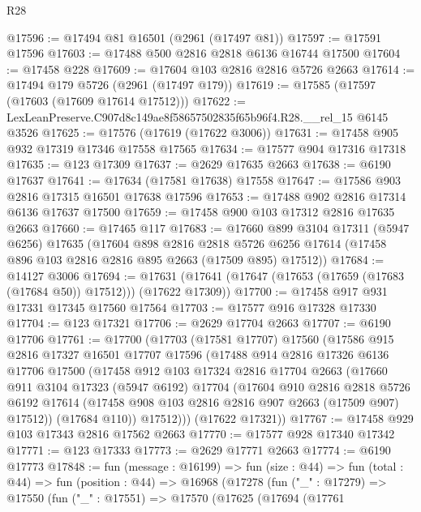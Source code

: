 \begin{lexlean}{R28}
\begin{coremodule}
@17596 := @17494 @81 @16501 (@2961 (@17497 @81))
@17597 := @17591 @17596
@17603 := @17488 @500 @2816 @2818 @6136 @16744 @17500
@17604 := @17458 @228
@17609 := @17604 @103 @2816 @2816 @5726 @2663
@17614 := @17494 @179 @5726 (@2961 (@17497 @179))
@17619 := @17585 (@17597 (@17603 (@17609 @17614 @17512)))
@17622 := LexLeanPreserve.C907d8c149ae8f58657502835f65b96f4.R28.__rel_15 @6145 @3526
@17625 := @17576 (@17619 (@17622 @3006))
@17631 := @17458 @905 @932 @17319 @17346 @17558 @17565
@17634 := @17577 @904 @17316 @17318
@17635 := @123 @17309
@17637 := @2629 @17635 @2663
@17638 := @6190 @17637
@17641 := @17634 (@17581 @17638) @17558
@17647 := @17586 @903 @2816 @17315 @16501 @17638 @17596
@17653 := @17488 @902 @2816 @17314 @6136 @17637 @17500
@17659 := @17458 @900 @103 @17312 @2816 @17635 @2663
@17660 := @17465 @117
@17683 := @17660
    @899
    @3104
    @17311
    (@5947 @6256)
    @17635
    (@17604
      @898
      @2816
      @2818
      @5726
      @6256
      @17614
      (@17458 @896 @103 @2816 @2816 @895 @2663 (@17509 @895) @17512))
@17684 := @14127 @3006
@17694 := @17631 (@17641 (@17647 (@17653 (@17659 (@17683 (@17684 @50)) @17512))) (@17622 @17309))
@17700 := @17458 @917 @931 @17331 @17345 @17560 @17564
@17703 := @17577 @916 @17328 @17330
@17704 := @123 @17321
@17706 := @2629 @17704 @2663
@17707 := @6190 @17706
@17761 := @17700
    (@17703
      (@17581 @17707)
      @17560
      (@17586
        @915
        @2816
        @17327
        @16501
        @17707
        @17596
        (@17488
          @914
          @2816
          @17326
          @6136
          @17706
          @17500
          (@17458
            @912
            @103
            @17324
            @2816
            @17704
            @2663
            (@17660
              @911
              @3104
              @17323
              (@5947 @6192)
              @17704
              (@17604
                @910
                @2816
                @2818
                @5726
                @6192
                @17614
                (@17458 @908 @103 @2816 @2816 @907 @2663 (@17509 @907) @17512))
              (@17684 @110))
            @17512)))
      (@17622 @17321))
@17767 := @17458 @929 @103 @17343 @2816 @17562 @2663
@17770 := @17577 @928 @17340 @17342
@17771 := @123 @17333
@17773 := @2629 @17771 @2663
@17774 := @6190 @17773
@17848 := fun (message : @16199) =>
  fun (size : @44) =>
  fun (total : @44) =>
  fun (position : @44) =>
  @16968
    (@17278
      (fun ("_" : @17279) =>
      @17550
        (fun ("_" : @17551) =>
        @17570
          (@17625
            (@17694
              (@17761

\end{coremodule}
\end{lexlean}
